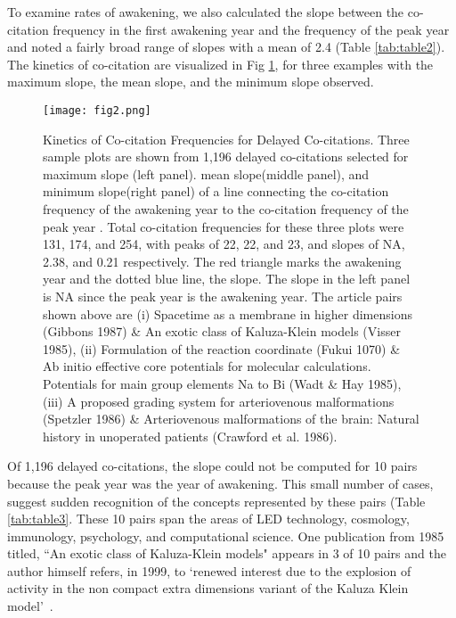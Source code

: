 \documentclass[utf8]{frontiersSCNS}
\begin{document}
To examine rates of awakening, we also calculated the slope between the co-citation frequency in the first awakening year and the frequency of the peak year and noted a fairly broad range of slopes with a mean of 2.4 (Table \ref{tab:table2}). The kinetics of co-citation are visualized in Fig \ref{fig:fig2}, for three examples with the maximum slope, the mean slope, and the minimum slope observed.  
\begin{figure}[h!]
\begin{center}
\texttt{[image: fig2.png]}%
\end{center}
\caption{Kinetics of Co-citation Frequencies for Delayed Co-citations. Three sample plots are shown from 1,196 delayed co-citations selected for maximum slope (left panel). mean slope(middle panel), and minimum slope(right panel) of a line connecting the co-citation frequency of the awakening year to the co-citation frequency of the peak year . Total co-citation frequencies for these three plots were 131, 174, and 254, with peaks of 22, 22, and 23, and slopes of NA, 2.38, and 0.21 respectively. The red triangle marks the awakening year and the dotted blue line, the slope. The slope in the left panel is NA since the peak year is the awakening year. The article pairs shown above are (i) Spacetime as a membrane in higher dimensions (Gibbons 1987) \& An exotic class of Kaluza-Klein models (Visser 1985), (ii) Formulation of the reaction coordinate (Fukui 1070) \& Ab initio effective core potentials for molecular calculations. Potentials for main group elements Na to Bi (Wadt \& Hay 1985), (iii) A proposed grading system for arteriovenous malformations (Spetzler 1986) \& Arteriovenous malformations of the brain: Natural history in unoperated patients (Crawford et al. 1986).}
\label{fig:fig2}
\end{figure}

Of 1,196 delayed co-citations, the slope could not be computed for 10 pairs because the peak year was the year of awakening. This small number of cases, suggest sudden recognition of the concepts represented by these pairs (Table \ref{tab:table3}. These 10 pairs span the areas of LED technology, cosmology, immunology, psychology, and computational science. One publication from 1985 titled, ``An exotic class of Kaluza-Klein models" appears in 3 of 10 pairs and the author himself refers, in 1999, to `renewed interest due to the explosion of activity in the non compact extra dimensions variant of the Kaluza Klein model'~\citep{visser_1999}.
\end{document}
